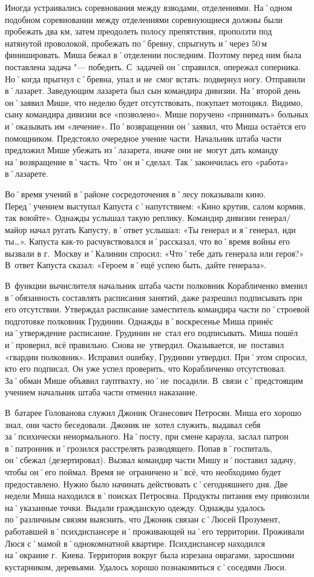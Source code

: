 Иногда устраивались соревнования между взводами, отделениями. На˚одном подобном соревновании между отделениями соревнующиеся должны были пробежать два км, затем преодолеть полосу препятствия, проползти под натянутой проволокой, пробежать по˚бревну, спрыгнуть и˚через 50\,м финишировать. Миша бежал в˚отделении последним. Поэтому перед ним была поставлена задача "--- победить. С~задачей он˚справился, опережал соперника. Но˚когда прыгнул с˚бревна, упал и не~смог встать: подвернул ногу. Отправили в˚лазарет. Заведующим лазарета был сын командира дивизии. На˚второй день он˚заявил Мише, что неделю будет отсутствовать, покупает мотоцикл. Видимо, сыну командира дивизии все «позволено». Мише поручено «принимать» больных и˚оказывать им «лечение». По˚возвращении он˚заявил, что Миша остаётся его помощником. Предстояло очередное учение части. Начальник штаба части предложил Мише убежать из˚лазарета, иначе они не~могут дать команду на˚возвращение в˚часть. Что˚он и˚сделал. Так˚закончилась его «работа» в˚лазарете.

Во˚время учений в˚районе сосредоточения в˚лесу показывали кино. Перед˚учением выступал Капуста с˚напутствием: «Кино крутив, салом кормив, так воюйте». Однажды услышал такую реплику. Командир дивизии генерал\-/майор начал ругать Капусту, в˚ответ услышал: «Ты генерал и я˚генерал, иди ты…». Капуста как-то расчувствовался и˚рассказал, что во˚время войны его вызвали в г.~Москву и˚Калинин спросил: «Что˚тебе дать генерала или героя?» В~ответ Капуста сказал: «Героем я˚ещё успею быть, дайте генерала». 

В~функции вычислителя начальник штаба части полковник Корабличенко вменил в˚обязанность составлять расписания занятий, даже разрешил подписывать при его отсутствии. Утверждал расписание заместитель командира части по˚строевой подготовке полковник Грудинин. Однажды в˚воскресенье Миша принёс на˚утверждение расписание. Грудинин не~стал его подписывать. Миша пошёл и˚проверил, всё правильно. Снова не~утвердил. Оказывается, не~поставил «гвардии полковник». Исправил ошибку, Грудинин утвердил. При˚этом спросил, кто его подписал. Он уже успел проверить, что Корабличенко отсутствовал. За˚обман Мише объявил гауптвахту, но˚не~посадили. В~связи с˚предстоящим учением начальник штаба части отменил наказание.


В~батарее Голованова служил Джоник Оганесович Петросян. Миша его хорошо знал, они часто беседовали. Джоник не~хотел служить, выдавал себя за˚психически ненормального. На˚посту, при смене караула, заслал патрон в˚патронник и˚грозился расстрелять разводящего. Попав в˚госпиталь, он˚сбежал (дезертировал). Вызвал командир части Мишу и˚поставил задачу, чтобы он˚его поймал. Время не~ограничено и˚всё, что необходимо будет предоставлено. Нужно было начинать действовать с˚сегодняшнего дня. Две недели Миша находился в˚поисках Петросяна. Продукты питания ему привозили на˚указанные точки. Выдали гражданскую одежду. Однажды удалось по˚различным связям выяснить, что Джоник связан с˚Люсей Прозумент, работавшей в˚психдиспансере и˚проживающей на˚его территории. Проживали Люся с˚мамой в˚однокомнатной квартире. Психдиспансер находился на˚окраине г.~Киева. Территория вокруг была изрезана оврагами, заросшими кустарником, деревьями. Удалось хорошо познакомиться с˚соседями Люси. 

